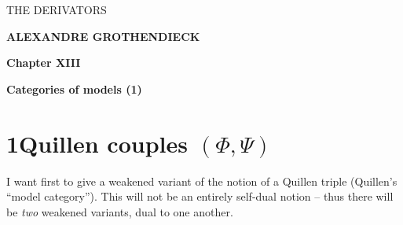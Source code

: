 \printedpage{--} %

\begin{center}
\vspace*{5cm}
{\LARGE\sffamily THE DERIVATORS}

\vspace{1.5cm}
{\large\textbf{ALEXANDRE GROTHENDIECK}}

\vspace{2.5cm}
{\large\textbf{Chapter XIII}}

\vspace{0.5cm}
{\large\textbf{Categories of models (1)}}
\end{center}

\clearpage

\printedpage{--} %

\vspace*{6cm}

\clearpage



\section*{1\quad Quillen couples $(\Phi, \Psi)$}

I want first to give a weakened variant of the notion of a Quillen triple (Quillen's ``model category''). This will not be an entirely self-dual notion -- thus there will be \textit{two} weakened variants, dual to one another.

